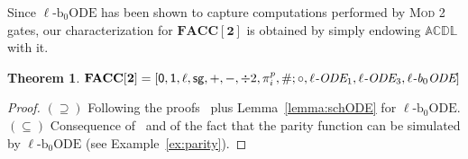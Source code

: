 \documentclass[11pt, oneside]{article}
\newcommand{\ACDL}{\mathbb{ACDL}}
\newcommand{\fun}[1]{\mathsf{#1}}
\newcommand{\FACC}{\mathbf{FACC[2]}}
\newtheorem{theorem}{Theorem}
\theoremstyle{definition}
\newcommand{\ODEACC}{\ell\text{-ODE}_{\text{FACC[2]}}}
\newcommand{\schODE}{\ell\text{-b}_0\text{ODE}}
\begin{document}
Since $\schODE$ has been shown to capture computations performed by \textsc{Mod 2} gates, our characterization for $\FACC$ is obtained by simply endowing $\ACDL$ with it.



\begin{theorem}\label{theorem:FACC}
$\FACC
%
        = [\fun{0}, \fun{1}, \ell, \fun{sg}, +, -, \div 2, \pi^p_i, \#; \circ, \ell\emph{-ODE}_1, \ell\emph{-ODE}_3, \ell\emph{-b}_0\emph{ODE}]
 $
\end{theorem}

\begin{proof}
    $(\supseteq)$ Following the proofs~\cite[Prop. 12, 17]{ADK24a} plus Lemma~\ref{lemma:schODE} for $\schODE$. 
    $(\subseteq)$ Consequence of~\cite[Th. 18]{ADK24a} and of the fact that the parity function can be simulated by $\schODE$ (see Example~\ref{ex:parity}).
\end{proof}
\end{document}
